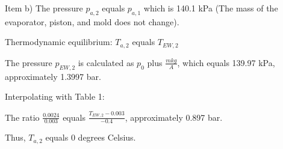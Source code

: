Item b) The pressure \( p_{a,2} \) equals \( p_{a,1} \) which is 140.1 kPa (The mass of the evaporator, piston, and mold does not change).

Thermodynamic equilibrium: \( T_{a,2} \) equals \( T_{EW,2} \)

The pressure \( p_{EW,2} \) is calculated as \( p_0 \) plus \( \frac{m k g}{A} \), which equals 139.97 kPa, approximately 1.3997 bar.

Interpolating with Table 1:

The ratio \( \frac{0.0024}{0.003} \) equals \( \frac{T_{EW,2} - 0.003}{-0.4} \), approximately 0.897 bar.

Thus, \( T_{a,2} \) equals 0 degrees Celsius.